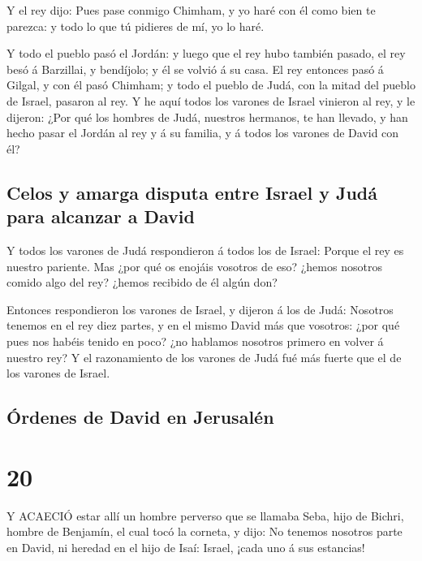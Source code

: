  Y el rey dijo: Pues pase conmigo Chimham, y yo haré con él
como bien te parezca: y todo lo que tú pidieres de mí, yo lo haré.

 Y todo el pueblo pasó el Jordán: y luego que el rey hubo
también pasado, el rey besó á Barzillai, y bendíjolo; y él se volvió á
su casa.  El rey entonces pasó á Gilgal, y con él pasó
Chimham; y todo el pueblo de Judá, con la mitad del pueblo de Israel,
pasaron al rey.  Y he aquí todos los varones de Israel
vinieron al rey, y le dijeron: ¿Por qué los hombres de Judá, nuestros
hermanos, te han llevado, y han hecho pasar el Jordán al rey y á su
familia, y á todos los varones de David con él?

\hypertarget{celos-y-amarga-disputa-entre-israel-y-juduxe1-para-alcanzar-a-david}{%
\subsection{Celos y amarga disputa entre Israel y Judá para alcanzar a
David}\label{celos-y-amarga-disputa-entre-israel-y-juduxe1-para-alcanzar-a-david}}

 Y todos los varones de Judá respondieron á todos los de
Israel: Porque el rey es nuestro pariente. Mas ¿por qué os enojáis
vosotros de eso? ¿hemos nosotros comido algo del rey? ¿hemos recibido de
él algún don?

 Entonces respondieron los varones de Israel, y dijeron á
los de Judá: Nosotros tenemos en el rey diez partes, y en el mismo David
más que vosotros: ¿por qué pues nos habéis tenido en poco? ¿no hablamos
nosotros primero en volver á nuestro rey? Y el razonamiento de los
varones de Judá fué más fuerte que el de los varones de Israel.

\hypertarget{uxf3rdenes-de-david-en-jerusaluxe9n}{%
\subsection{Órdenes de David en
Jerusalén}\label{uxf3rdenes-de-david-en-jerusaluxe9n}}

\hypertarget{section-19}{%
\section{20}\label{section-19}}

 Y ACAECIÓ estar allí un hombre perverso que se llamaba
Seba, hijo de Bichri, hombre de Benjamín, el cual tocó la corneta, y
dijo: No tenemos nosotros parte en David, ni heredad en el hijo de Isaí:
Israel, ¡cada uno á sus estancias!

